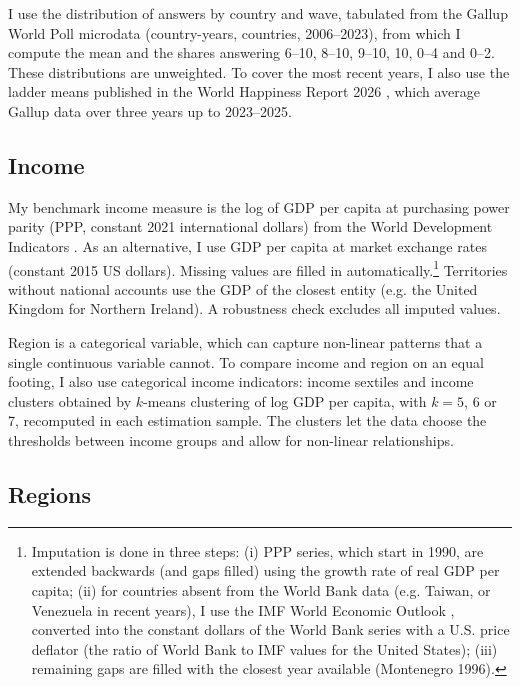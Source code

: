\documentclass[12pt]{article}
\begin{document}
I use the distribution of answers by country and wave, tabulated from the Gallup World Poll microdata (\nGallupCountryYears country-years, \nGallupCountries countries, 2006--2023), from which I compute the mean and the shares answering 6--10, 8--10, 9--10, 10, 0--4 and 0--2. These distributions are unweighted. To cover the most recent years, I also use the ladder means published in the World Happiness Report 2026 \citep{whr_2026}, which average Gallup data over three years up to 2023--2025.

\subsection{Income}\label{subsec:income}

My benchmark income measure is the log of GDP per capita at purchasing power parity (PPP, constant 2021 international dollars) from the World Development Indicators \citep{worldbank_wdi_2026}. As an alternative, I use GDP per capita at market exchange rates (constant 2015 US dollars). Missing values are filled in automatically.\footnote{Imputation is done in three steps: (i) PPP series, which start in 1990, are extended backwards (and gaps filled) using the growth rate of real GDP per capita; (ii) for countries absent from the World Bank data (e.g. Taiwan, or Venezuela in recent years), I use the IMF World Economic Outlook \citep{imf_weo_2026}, converted into the constant dollars of the World Bank series with a U.S. price deflator (the ratio of World Bank to IMF values for the United States); (iii) remaining gaps are filled with the closest year available (Montenegro 1996).} Territories without national accounts use the GDP of the closest entity (e.g. the United Kingdom for Northern Ireland). A robustness check excludes all imputed values.

\ifshowregion
Region is a categorical variable, which can capture non-linear patterns that a single continuous variable cannot. To compare income and region on an equal footing, I also use categorical income indicators: income sextiles and income clusters obtained by $k$-means clustering of log GDP per capita, with $k = 5$, 6 or 7, recomputed in each estimation sample. The clusters let the data choose the thresholds between income groups and allow for non-linear relationships.
\fi

\ifshowregion
\subsection{Regions}\label{subsec:regions}
\end{document}
